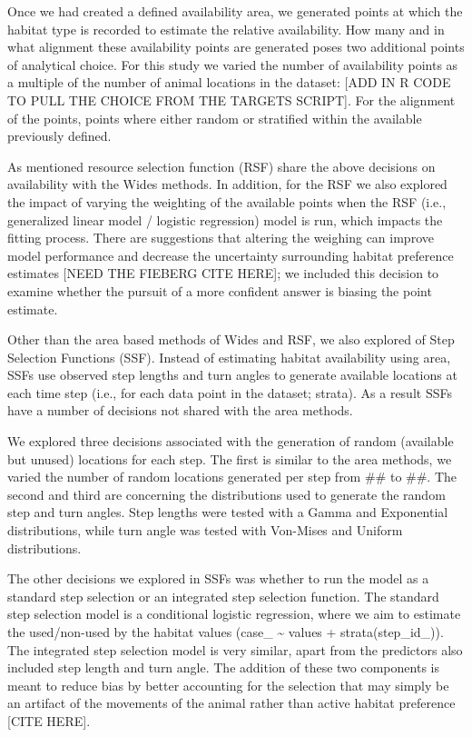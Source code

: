 \documentclass[10pt,a4paper]{article}
\begin{document}
Once we had created a defined availability area, we generated points at which the habitat type is recorded to estimate the relative availability.
How many and in what alignment these availability points are generated poses two additional points of analytical choice.
For this study we varied the number of availability points as a multiple of the number of animal locations in the dataset: {[}ADD IN R CODE TO PULL THE CHOICE FROM THE TARGETS SCRIPT{]}.
For the alignment of the points, points where either random or stratified within the available previously defined.

As mentioned resource selection function (RSF) share the above decisions on availability with the Wides methods.
In addition, for the RSF we also explored the impact of varying the weighting of the available points when the RSF (i.e., generalized linear model / logistic regression) model is run, which impacts the fitting process.
There are suggestions that altering the weighing can improve model performance and decrease the uncertainty surrounding habitat preference estimates {[}NEED THE FIEBERG CITE HERE{]}; we included this decision to examine whether the pursuit of a more confident answer is biasing the point estimate.

Other than the area based methods of Wides and RSF, we also explored of Step Selection Functions (SSF).
Instead of estimating habitat availability using area, SSFs use observed step lengths and turn angles to generate available locations at each time step (i.e., for each data point in the dataset; strata).
As a result SSFs have a number of decisions not shared with the area methods.

We explored three decisions associated with the generation of random (available but unused) locations for each step.
The first is similar to the area methods, we varied the number of random locations generated per step from \#\# to \#\#.
The second and third are concerning the distributions used to generate the random step and turn angles.
Step lengths were tested with a Gamma and Exponential distributions, while turn angle was tested with Von-Mises and Uniform distributions.

The other decisions we explored in SSFs was whether to run the model as a standard step selection or an integrated step selection function.
The standard step selection model is a conditional logistic regression, where we aim to estimate the used/non-used by the habitat values (case\_ \textasciitilde{} values + strata(step\_id\_)).
The integrated step selection model is very similar, apart from the predictors also included step length and turn angle.
The addition of these two components is meant to reduce bias by better accounting for the selection that may simply be an artifact of the movements of the animal rather than active habitat preference {[}CITE HERE{]}.
\end{document}
